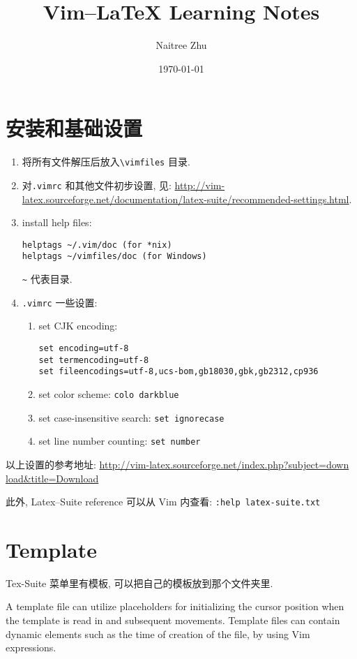 \documentclass{article}
\title{Vim--\LaTeX{} Learning Notes}
\author{Naitree Zhu}
\date{\today}
\begin{document}
\maketitle
\part{安装和基础设置}
\begin{enumerate}
\item 将所有文件解压后放入\verb`\vimfiles` 目录.
\item 对\verb`.vimrc` 和其他文件初步设置, 见: \hspace{15pt}\url{http://vim-latex.sourceforge.net/documentation/latex-suite/recommended-settings.html}.
\item install help files:
\begin{verbatim}
helptags ~/.vim/doc (for *nix)
helptags ~/vimfiles/doc (for Windows)
\end{verbatim}
\verb`~` 代表目录.
\item \verb`.vimrc` 一些设置:
\begin{enumerate}
\item set CJK encoding:
\begin{verbatim}
set encoding=utf-8
set termencoding=utf-8
set fileencodings=utf-8,ucs-bom,gb18030,gbk,gb2312,cp936
\end{verbatim}
\item set color scheme: \verb`colo darkblue` 
\item set case-insensitive search: \verb`set ignorecase`
\item set line number counting: \verb`set number`
\end{enumerate}
\end{enumerate}
以上设置的参考地址: \hspace{80pt}\url{http://vim-latex.sourceforge.net/index.php?subject=down load&title=Download}

此外, Latex--Suite reference 可以从 Vim 内查看: \verb`:help latex-suite.txt`
\part{Template}
Tex-Suite 菜单里有模板, 可以把自己的模板放到那个文件夹里.

A template file can utilize placeholders for initializing the cursor position when the template is read in and subsequent movements.
Template files can contain dynamic elements such as the time of creation of the file, by using Vim expressions.
\end{document}
